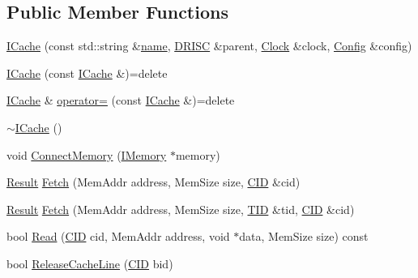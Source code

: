 \subsection*{Public Member Functions}
\begin{DoxyCompactItemize}
\item 
\hyperlink{class_simulator_1_1drisc_1_1_i_cache_abccbf70d026fcd78e099fe46941ee1ef}{I\+Cache} (const std\+::string \&\hyperlink{mtconf_8c_a8f8f80d37794cde9472343e4487ba3eb}{name}, \hyperlink{class_simulator_1_1_d_r_i_s_c}{D\+R\+I\+S\+C} \&parent, \hyperlink{class_simulator_1_1_clock}{Clock} \&clock, \hyperlink{class_config}{Config} \&config)
\item 
\hyperlink{class_simulator_1_1drisc_1_1_i_cache_a5da34e6e93ff85df68fef014b318792c}{I\+Cache} (const \hyperlink{class_simulator_1_1drisc_1_1_i_cache}{I\+Cache} \&)=delete
\item 
\hyperlink{class_simulator_1_1drisc_1_1_i_cache}{I\+Cache} \& \hyperlink{class_simulator_1_1drisc_1_1_i_cache_a1c8adc5c5595fac4b6cdb00f9ae990cc}{operator=} (const \hyperlink{class_simulator_1_1drisc_1_1_i_cache}{I\+Cache} \&)=delete
\item 
\hyperlink{class_simulator_1_1drisc_1_1_i_cache_a432627a76862df4755a991d5fe34a307}{$\sim$\+I\+Cache} ()
\item 
void \hyperlink{class_simulator_1_1drisc_1_1_i_cache_a4d67069af1ac468ddc91e9b5eee096c8}{Connect\+Memory} (\hyperlink{class_simulator_1_1_i_memory}{I\+Memory} $\ast$memory)
\item 
\hyperlink{namespace_simulator_a4b6b5616e7236c0c131516a441776805}{Result} \hyperlink{class_simulator_1_1drisc_1_1_i_cache_a662072b848e493954869c6cf35384368}{Fetch} (Mem\+Addr address, Mem\+Size size, \hyperlink{namespace_simulator_a97f45fafcb1aafc0f269a19608b39d60}{C\+I\+D} \&cid)
\item 
\hyperlink{namespace_simulator_a4b6b5616e7236c0c131516a441776805}{Result} \hyperlink{class_simulator_1_1drisc_1_1_i_cache_ad30934eac15d9722ad5947c33368d47b}{Fetch} (Mem\+Addr address, Mem\+Size size, \hyperlink{namespace_simulator_a483cc4ecee1736e895054617672cded5}{T\+I\+D} \&tid, \hyperlink{namespace_simulator_a97f45fafcb1aafc0f269a19608b39d60}{C\+I\+D} \&cid)
\item 
bool \hyperlink{class_simulator_1_1drisc_1_1_i_cache_a5e1200c1c47897335d9a492b6f4dd664}{Read} (\hyperlink{namespace_simulator_a97f45fafcb1aafc0f269a19608b39d60}{C\+I\+D} cid, Mem\+Addr address, void $\ast$data, Mem\+Size size) const 
\item 
bool \hyperlink{class_simulator_1_1drisc_1_1_i_cache_ad92a2d648a3b0aa97baff394c1751944}{Release\+Cache\+Line} (\hyperlink{namespace_simulator_a97f45fafcb1aafc0f269a19608b39d60}{C\+I\+D} bid)

\end{DoxyCompactItemize}
